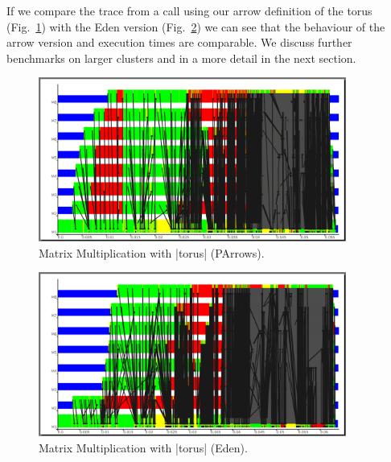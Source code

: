 If we compare the trace from a call using our arrow definition of the torus (Fig.~\ref{fig:torus_parrows_trace}) with the Eden version (Fig.~\ref{fig:torus_eden_trace}) we can see that the behaviour of the arrow version and execution times are comparable. We discuss further benchmarks on larger clusters and in a more detail in the next section.
\begin{figure}[tb]
	\centering
	\includegraphics[width=0.9\textwidth]{images/torus_matrix_parrows_scale}
	\caption[Matrix Multiplication with |torus| (Parrows)]{Matrix Multiplication with |torus| (PArrows).}
	\label{fig:torus_parrows_trace}
\end{figure}

\begin{figure}[tb]
	\centering
	\includegraphics[width=0.9\textwidth]{images/torus_matrix_eden_scale}
	\caption[Matrix Multiplication with |torus| (Eden)]{Matrix Multiplication with |torus| (Eden).}
	\label{fig:torus_eden_trace}
\end{figure}


